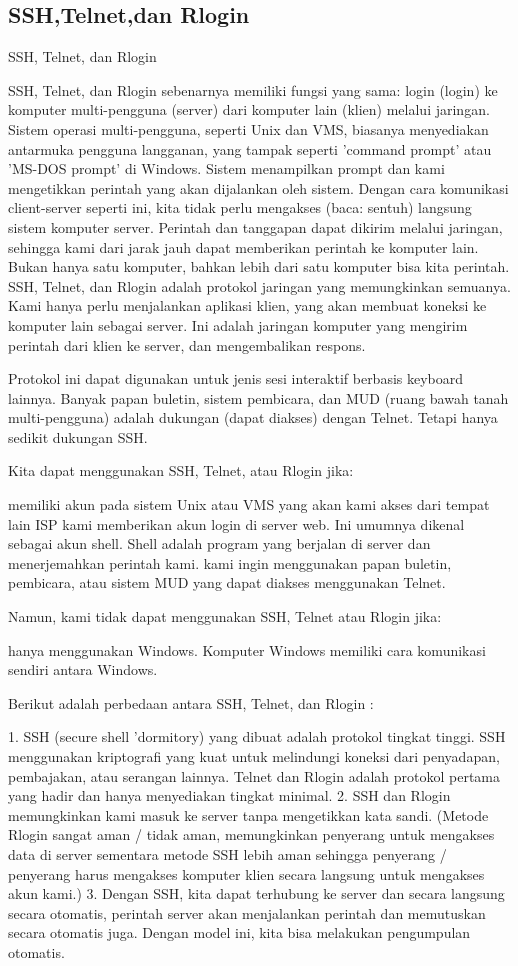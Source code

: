 \subsection {SSH,Telnet,dan Rlogin}

SSH, Telnet, dan Rlogin

SSH, Telnet, dan Rlogin sebenarnya memiliki fungsi yang sama: login (login) ke komputer multi-pengguna (server) dari komputer lain (klien) melalui jaringan. Sistem operasi multi-pengguna, seperti Unix dan VMS, biasanya menyediakan antarmuka pengguna langganan, yang tampak seperti 'command prompt' atau 'MS-DOS prompt' di Windows. Sistem menampilkan prompt dan kami mengetikkan perintah yang akan dijalankan oleh sistem.
Dengan cara komunikasi client-server seperti ini, kita tidak perlu mengakses (baca: sentuh) langsung sistem komputer server. Perintah dan tanggapan dapat dikirim melalui jaringan, sehingga kami dari jarak jauh dapat memberikan perintah ke komputer lain. Bukan hanya satu komputer, bahkan lebih dari satu komputer bisa kita perintah.
SSH, Telnet, dan Rlogin adalah protokol jaringan yang memungkinkan semuanya. Kami hanya perlu menjalankan aplikasi klien, yang akan membuat koneksi ke komputer lain sebagai server. Ini adalah jaringan komputer yang mengirim perintah dari klien ke server, dan mengembalikan respons.

Protokol ini dapat digunakan untuk jenis sesi interaktif berbasis keyboard lainnya. Banyak papan buletin, sistem pembicara, dan MUD (ruang bawah tanah multi-pengguna) adalah dukungan (dapat diakses) dengan Telnet. Tetapi hanya sedikit dukungan SSH.

Kita dapat menggunakan SSH, Telnet, atau Rlogin jika:

    memiliki akun pada sistem Unix atau VMS yang akan kami akses dari tempat lain
    ISP kami memberikan akun login di server web. Ini umumnya dikenal sebagai akun shell. Shell adalah program yang berjalan di server dan menerjemahkan perintah kami.
    kami ingin menggunakan papan buletin, pembicara, atau sistem MUD yang dapat diakses menggunakan Telnet.

Namun, kami tidak dapat menggunakan SSH, Telnet atau Rlogin jika:

    hanya menggunakan Windows. Komputer Windows memiliki cara komunikasi sendiri antara Windows.

	Berikut adalah perbedaan antara SSH, Telnet, dan Rlogin :

1. SSH (secure shell 'dormitory) yang dibuat adalah protokol tingkat tinggi. SSH menggunakan kriptografi yang kuat untuk melindungi koneksi dari penyadapan, pembajakan, atau serangan lainnya. Telnet dan Rlogin adalah protokol pertama yang hadir dan hanya menyediakan tingkat minimal.
2. SSH dan Rlogin memungkinkan kami masuk ke server tanpa mengetikkan kata sandi. (Metode Rlogin sangat aman / tidak aman, memungkinkan penyerang untuk mengakses data di server sementara metode SSH lebih aman sehingga penyerang / penyerang harus mengakses komputer klien secara langsung untuk mengakses akun kami.)
3. Dengan SSH, kita dapat terhubung ke server dan secara langsung secara otomatis, perintah server akan menjalankan perintah dan memutuskan secara otomatis juga. Dengan model ini, kita bisa melakukan pengumpulan otomatis.


